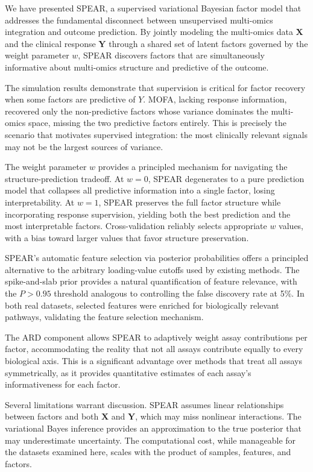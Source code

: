 \documentclass[11pt]{article}
\begin{document}
We have presented SPEAR, a supervised variational Bayesian factor model that addresses the fundamental disconnect between unsupervised multi-omics integration and outcome prediction. By jointly modeling the multi-omics data $\mathbf{X}$ and the clinical response $\mathbf{Y}$ through a shared set of latent factors governed by the weight parameter $w$, SPEAR discovers factors that are simultaneously informative about multi-omics structure and predictive of the outcome.

The simulation results demonstrate that supervision is critical for factor recovery when some factors are predictive of $Y$. MOFA, lacking response information, recovered only the non-predictive factors whose variance dominates the multi-omics space, missing the two predictive factors entirely. This is precisely the scenario that motivates supervised integration: the most clinically relevant signals may not be the largest sources of variance.

The weight parameter $w$ provides a principled mechanism for navigating the structure-prediction tradeoff. At $w = 0$, SPEAR degenerates to a pure prediction model that collapses all predictive information into a single factor, losing interpretability. At $w = 1$, SPEAR preserves the full factor structure while incorporating response supervision, yielding both the best prediction and the most interpretable factors. Cross-validation reliably selects appropriate $w$ values, with a bias toward larger values that favor structure preservation.

SPEAR's automatic feature selection via posterior probabilities offers a principled alternative to the arbitrary loading-value cutoffs used by existing methods. The spike-and-slab prior provides a natural quantification of feature relevance, with the $P > 0.95$ threshold analogous to controlling the false discovery rate at 5\%. In both real datasets, selected features were enriched for biologically relevant pathways, validating the feature selection mechanism.

The ARD component allows SPEAR to adaptively weight assay contributions per factor, accommodating the reality that not all assays contribute equally to every biological axis. This is a significant advantage over methods that treat all assays symmetrically, as it provides quantitative estimates of each assay's informativeness for each factor.

Several limitations warrant discussion. SPEAR assumes linear relationships between factors and both $\mathbf{X}$ and $\mathbf{Y}$, which may miss nonlinear interactions. The variational Bayes inference provides an approximation to the true posterior that may underestimate uncertainty. The computational cost, while manageable for the datasets examined here, scales with the product of samples, features, and factors.
\end{document}
